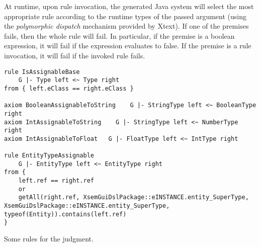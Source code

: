 At runtime, upon rule invocation, the generated Java system will select the most
appropriate rule according to the runtime types of the passed argument (using
the \textit{polymorphic dispatch} mechanism provided by Xtext).
If one of the premises fails, then the whole rule will fail.
In particular, if the premise is a boolean expression, it will fail if the
expression evaluates to false.  If the premise is a rule invocation, it will
fail if the invoked rule fails.

% 
% 

\begin{listing}[tb]
\begin{lstlisting}[language=xsemantics] 
rule IsAssignableBase
	G |- Type left <~ Type right
from { left.eClass == right.eClass }

axiom BooleanAssignableToString    G |- StringType left <~ BooleanType right
axiom IntAssignableToString    G |- StringType left <~ NumberType right
axiom IntAssignableToFloat   G |- FloatType left <~ IntType right

rule EntityTypeAssignable
	G |- EntityType left <~ EntityType right
from {
	left.ref == right.ref
	or
	getAll(right.ref, XsemGuiDslPackage::eINSTANCE.entity_SuperType, XsemGuiDslPackage::eINSTANCE.entity_SuperType, typeof(Entity)).contains(left.ref)
}
\end{lstlisting}
\caption{Some rules for the  judgment.}
\label{lst:xsem-assignable}
\end{listing}

